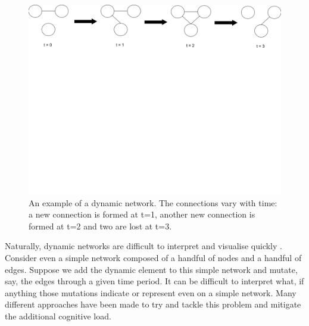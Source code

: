 \begin{figure}[H]
\begin{center}
\includegraphics[trim={0 19cm 0 0}, clip, width=140mm]{./Figures/exampleDynamicNetwork.png}
\caption{An example of a dynamic network. The connections vary with time: a new connection is formed at t=1, another new connection is formed at t=2 and two are lost at t=3.}
\label{exampleDynamicNetwork}
\end{center}
\end{figure}

Naturally, dynamic networks are difficult to interpret and visualise quickly \cite{iddps}. Consider even a simple network composed of a handful of nodes and a handful of edges. Suppose we add the dynamic element to this simple network and mutate, say, the edges through a given time period. It can be difficult to interpret what, if anything those mutations indicate or represent even on a simple network. Many different approaches have been made to try and tackle this problem and mitigate the additional cognitive load. 

